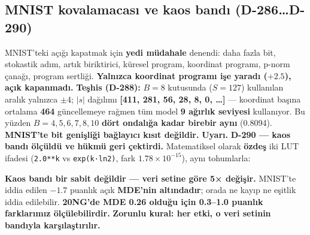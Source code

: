 \documentclass[11pt]{article}
\newenvironment{notkutu}{\def\FrameCommand{\fboxsep=6pt\colorbox{kutu}}\MakeFramed{\advance\hsize-\width\FrameRestore}\small}{\endMakeFramed}
\begin{document}
\subsection*{MNIST kovalamacası ve kaos bandı (D-286…D-290)}
MNIST'teki açığı kapatmak için \textbf{yedi müdahale} denendi: daha fazla bit, stokastik adım, artık biriktirici, küresel program, koordinat programı, p-norm çanağı, program sertliği. \textbf{Yalnızca koordinat programı işe yaradı ($+2.5$), açık kapanmadı.}
\textbf{Teşhis (D-288):} $B{=}8$ kutusunda ($S{=}127$) kullanılan aralık yalnızca $\pm4$; $\lvert s\rvert$ dağılımı \textbf{[411, 281, 56, 28, 8, 0, …]} — koordinat başına ortalama \textbf{464} güncellemeye rağmen tüm model \textbf{9 ağırlık seviyesi} kullanıyor. Bu yüzden $B{=}4,5,6,7,8,10$ \textbf{dört ondalığa kadar birebir aynı} (0.8094). \textbf{MNIST'te bit genişliği bağlayıcı kısıt değildir.}
\begin{notkutu}\textbf{Uyarı.} \textbf{D-290 — kaos bandı ölçüldü ve hükmü geri çektirdi.} Matematiksel olarak \textbf{özdeş} iki LUT ifadesi (\texttt{2.0**k} vs \texttt{exp(k·ln2)}, fark $1.78\times10^{-15}$), aynı tohumlarla:
\begin{center}\small{}\end{center}
\textbf{Kaos bandı bir sabit değildir — veri setine göre 5× değişir.} MNIST'te iddia edilen $-1.7$ puanlık açık \textbf{MDE'nin altındadır}; orada ne kayıp ne eşitlik iddia edilebilir. \textbf{20NG'de MDE 0.26 olduğu için 0.3–1.0 puanlık farklarımız ölçülebilirdir.}
\textbf{Zorunlu kural: her etki, o veri setinin bandıyla karşılaştırılır.}
\end{notkutu}
\end{document}
